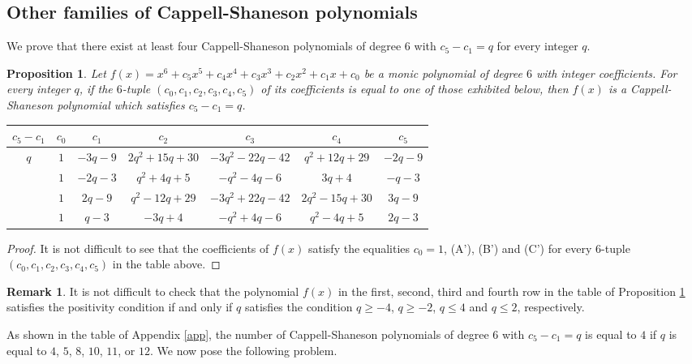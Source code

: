 \documentclass{amsart}
\theoremstyle{plain}
\newtheorem{prop}[thm]{Proposition}
\theoremstyle{definition}
\newtheorem{rem}[thm]{Remark}
\theoremstyle{remark}
\begin{document}
\subsection{Other families of Cappell-Shaneson polynomials}

We prove that there exist at least four Cappell-Shaneson polynomials of degree $6$ 
with $c_5-c_1=q$ for every integer $q$. 

\begin{prop}\label{hol}
Let $f(x)=x^6+c_5x^5+c_4x^4+c_3x^3+c_2x^2+c_1x+c_0$ be 
a monic polynomial of degree $6$ with integer coefficients. 
For every integer $q$, if the $6$-tuple $(c_0,c_1,c_2,c_3,c_4,c_5)$ of 
its coefficients is equal to one of those exhibited below, 
then $f(x)$ is a Cappell-Shaneson polynomial which satisfies $c_5-c_1=q$. 
\begin{small}
\begin{longtable}{|c||c|c|c|c|c|c|} \hline 
$c_5\! -\! c_1$ & $c_0$ & $c_1$ & $c_2$ & $c_3$ & $c_4$ & $c_5$ \\ \hline 
$q$ & $1$ & $-3q-9$ & $2q^2+15q+30$ & $-3q^2-22q-42$ & $q^2+12q+29$ & $-2q-9$ \\ \cline{2-7}
& $1$ & $-2q-3$ & $q^2+4q+5$ & $-q^2-4q-6$ & $3q+4$ & $-q-3$ \\ \cline{2-7}
& $1$ & $2q-9$ & $q^2-12q+29$ & $-3q^2+22q-42$ & $2q^2-15q+30$ & $3q-9$ \\ \cline{2-7}
& $1$ & $q-3$ & $-3q+4$ & $-q^2+4q-6$ & $q^2-4q+5$ & $2q-3$ \\ \hline
\end{longtable}
\end{small}
\end{prop}

\begin{proof}
It is not difficult to see that the coefficients of $f(x)$ 
satisfy the equalities $c_0=1$, (A'), (B') and (C') 
for every $6$-tuple $(c_0,c_1,c_2,c_3,c_4,c_5)$ in the table above. 
\end{proof}

\begin{rem}
It is not difficult to check that 
the polynomial $f(x)$ in the first, second, third and fourth row 
in the table of Proposition \ref{hol} satisfies the positivity condition 
if and only if $q$ satisfies the condition $q\geq -4$, $q\geq -2$, $q\leq 4$ and $q\leq 2$, respectively. 
\end{rem}

As shown in the table of Appendix \ref{app}, the number of Cappell-Shaneson polynomials of degree $6$ 
with $c_5-c_1=q$ is equal to $4$ if $q$ is equal to $4$, $5$, $8$, $10$, $11$, or $12$. 
We now pose the following problem. 
\end{document}
